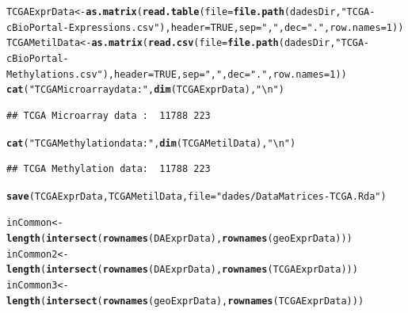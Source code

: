 \documentclass[a4paper,10pt]{article}\usepackage[]{graphicx}\usepackage[]{color}
\makeatletter
\newcommand{\hlnum}[1]{\textcolor[rgb]{0.686,0.059,0.569}{#1}}%
\newcommand{\hlstr}[1]{\textcolor[rgb]{0.192,0.494,0.8}{#1}}%
\newcommand{\hlstd}[1]{\textcolor[rgb]{0.345,0.345,0.345}{#1}}%
\newcommand{\hlkwb}[1]{\textcolor[rgb]{0.69,0.353,0.396}{#1}}%
\newcommand{\hlkwc}[1]{\textcolor[rgb]{0.333,0.667,0.333}{#1}}%
\newcommand{\hlkwd}[1]{\textcolor[rgb]{0.737,0.353,0.396}{\textbf{#1}}}%
\newenvironment{kframe}{%
 \def\at@end@of@kframe{}%
 \ifinner\ifhmode%
  \def\at@end@of@kframe{\end{minipage}}%
  \begin{minipage}{\columnwidth}%
 \fi\fi%
 \def\FrameCommand##1{\hskip\@totalleftmargin \hskip-\fboxsep
 \colorbox{shadecolor}{##1}\hskip-\fboxsep
     \hskip-\linewidth \hskip-\@totalleftmargin \hskip\columnwidth}%
 \MakeFramed {\advance\hsize-\width
   \@totalleftmargin\z@ \linewidth\hsize
   \@setminipage}}%
 {\par\unskip\endMakeFramed%
 \at@end@of@kframe}
\newenvironment{knitrout}{}{} %
\makeatother
\begin{document}
\begin{knitrout}
\color{fgcolor}\begin{kframe}
\begin{alltt}
\hlstd{TCGAExprData} \hlkwb{<-}  \hlkwd{as.matrix}\hlstd{(}\hlkwd{read.table}\hlstd{(}\hlkwc{file}\hlstd{=}\hlkwd{file.path}\hlstd{(dadesDir,}\hlstr{"TCGA-cBioPortal-Expressions.csv"}\hlstd{),} \hlkwc{header}\hlstd{=}\hlnum{TRUE}\hlstd{,} \hlkwc{sep}\hlstd{=}\hlstr{","}\hlstd{,} \hlkwc{dec}\hlstd{=}\hlstr{"."}\hlstd{,} \hlkwc{row.names}\hlstd{=}\hlnum{1}\hlstd{))}
\hlstd{TCGAMetilData} \hlkwb{<-}  \hlkwd{as.matrix}\hlstd{(}\hlkwd{read.csv}\hlstd{(}\hlkwc{file}\hlstd{=}\hlkwd{file.path}\hlstd{(dadesDir,}\hlstr{"TCGA-cBioPortal-Methylations.csv"}\hlstd{),} \hlkwc{header}\hlstd{=}\hlnum{TRUE}\hlstd{,} \hlkwc{sep}\hlstd{=}\hlstr{","}\hlstd{,} \hlkwc{dec}\hlstd{=}\hlstr{"."}\hlstd{,} \hlkwc{row.names}\hlstd{=}\hlnum{1}\hlstd{))}
\hlkwd{cat}\hlstd{(}\hlstr{"TCGA Microarray data : "}\hlstd{,} \hlkwd{dim}\hlstd{(TCGAExprData),} \hlstr{"\textbackslash{}n"}\hlstd{)}
\end{alltt}
\begin{verbatim}
## TCGA Microarray data :  11788 223
\end{verbatim}
\begin{alltt}
\hlkwd{cat}\hlstd{(}\hlstr{"TCGA Methylation data: "}\hlstd{,} \hlkwd{dim}\hlstd{(TCGAMetilData),} \hlstr{"\textbackslash{}n"}\hlstd{)}
\end{alltt}
\begin{verbatim}
## TCGA Methylation data:  11788 223
\end{verbatim}
\begin{alltt}
\hlkwd{save}\hlstd{(TCGAExprData, TCGAMetilData,} \hlkwc{file}\hlstd{=}\hlstr{"dades/DataMatrices-TCGA.Rda"}\hlstd{)}
\end{alltt}
\end{kframe}
\end{knitrout}

\begin{knitrout}
\color{fgcolor}\begin{kframe}
\begin{alltt}
\hlstd{inCommon}\hlkwb{<-} \hlkwd{length}\hlstd{(}\hlkwd{intersect}\hlstd{(}\hlkwd{rownames}\hlstd{(DAExprData),} \hlkwd{rownames}\hlstd{(geoExprData)))}
\hlstd{inCommon2} \hlkwb{<-} \hlkwd{length}\hlstd{(}\hlkwd{intersect}\hlstd{(}\hlkwd{rownames}\hlstd{(DAExprData),} \hlkwd{rownames}\hlstd{(TCGAExprData)))}
\hlstd{inCommon3} \hlkwb{<-} \hlkwd{length}\hlstd{(}\hlkwd{intersect}\hlstd{(}\hlkwd{rownames}\hlstd{(geoExprData),} \hlkwd{rownames}\hlstd{(TCGAExprData)))}
\end{alltt}
\end{kframe}
\end{knitrout}
\end{document}
